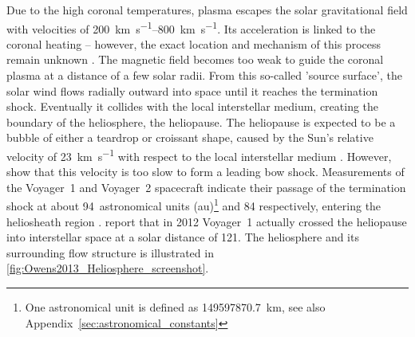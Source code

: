 Due to the high coronal temperatures, plasma escapes the solar gravitational field \citep{Parker1958} with velocities of \SIrange{200}{800}{\km\per\s}. Its acceleration is linked to the coronal heating -- however, the exact location and mechanism of this process remain unknown \citep{Hollweg1985,McComas2007,Fox2015,Cranmer2017}. The magnetic field becomes too weak to guide the coronal plasma at a distance of a few solar radii. From this so-called 'source surface', the solar wind flows radially outward into space until it reaches the termination shock. Eventually it collides with the local interstellar medium, creating the boundary of the heliosphere, the heliopause. The heliopause is expected to be a bubble of either a teardrop or croissant shape, caused by the Sun's relative velocity of \SI{23}{\km\per\s} with respect to the local interstellar medium \citep{Owens2013, Opher2015}. However, \citet{McComas2012} show that this velocity is too slow to form a leading bow shock. Measurements of the Voyager~1 and Voyager~2 spacecraft indicate their passage of the termination shock at about 94~astronomical units (au)\footnote{One astronomical unit is defined as \SI{149597870.7}{\km}, see also Appendix~\ref{sec:astronomical_constants}} and \SI{84}{\au} respectively, entering the heliosheath region \citep{Owens2013}. \citet{Gurnett2013} report that in 2012 Voyager~1 actually crossed the heliopause into interstellar space at a solar distance of \SI{121}{\au}. The heliosphere and its surrounding flow structure is illustrated in \autoref{fig:Owens2013_Heliosphere_screenshot}.
